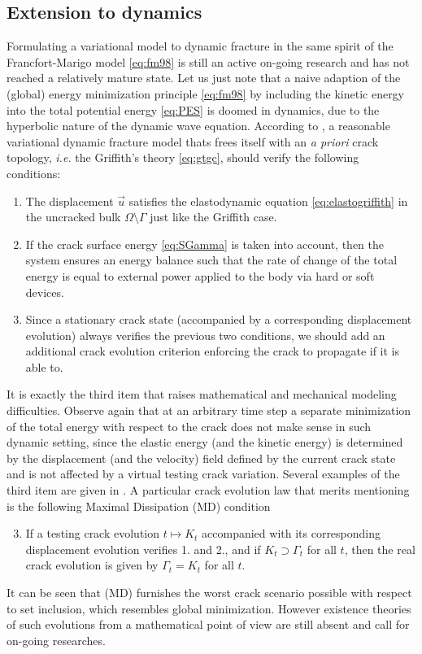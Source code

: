 \subsection{Extension to dynamics}
Formulating a variational model to dynamic fracture in the same spirit of the Francfort-Marigo model \eqref{eq:fm98} is still an active on-going research and has not reached a relatively mature state. Let us just note that a naive adaption of the (global) energy minimization principle \eqref{eq:fm98} by including the kinetic energy into the total potential energy \eqref{eq:PES} is doomed in dynamics, due to the hyperbolic nature of the dynamic wave equation. According to \cite{Larsen:2010}, a reasonable variational dynamic fracture model thats frees itself with an \emph{a priori} crack topology, \emph{i.e.} the Griffith's theory \eqref{eq:gtgc}, should verify the following conditions:
\begin{enumerate}
\item The displacement $\vec{u}$ satisfies the elastodynamic equation \eqref{eq:elastogriffith} in the uncracked bulk $\Omega\setminus\Gamma$ just like the Griffith case.

\item If the crack surface energy \eqref{eq:SGamma} is taken into account, then the system ensures an energy balance such that the rate of change of the total energy is equal to external power applied to the body via hard or soft devices.

\item Since a stationary crack state (accompanied by a corresponding displacement evolution) always verifies the previous two conditions, we should add an additional crack evolution criterion enforcing the crack to propagate if it is able to.
\end{enumerate}

It is exactly the third item that raises mathematical and mechanical modeling difficulties. Observe again that at an arbitrary time step a separate minimization of the total energy with respect to the crack does not make sense in such dynamic setting, since the elastic energy (and the kinetic energy) is determined by the displacement (and the velocity) field defined by the current crack state and is not affected by a virtual testing crack variation. Several examples of the third item are given in \cite{Larsen:2010}. A particular crack evolution law that merits mentioning is the following Maximal Dissipation (MD) condition
\begin{enumerate}
\setcounter{enumi}{2}
\item If a testing crack evolution $t\mapsto K_t$ accompanied with its corresponding displacement evolution verifies 1. and 2., and if $K_t\supset\Gamma_t$ for all $t$, then the real crack evolution is given by $\Gamma_t=K_t$ for all $t$.
\end{enumerate}
It can be seen that (MD) furnishes the worst crack scenario possible with respect to set inclusion, which resembles global minimization. However existence theories of such evolutions from a mathematical point of view are still absent and call for on-going researches.

